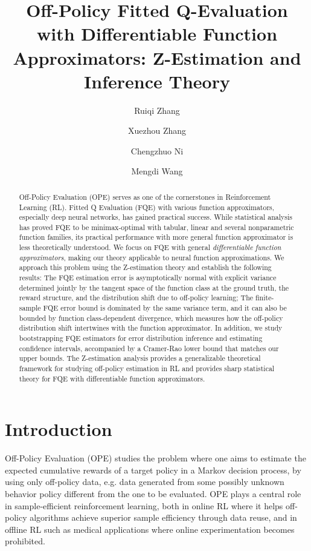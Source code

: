 \documentclass{article}
\numberwithin{equation}{section}
\theoremstyle{plain}
\theoremstyle{definition}
\theoremstyle{remark}
\begin{document}
\title{Off-Policy Fitted Q-Evaluation with Differentiable Function Approximators: Z-Estimation and Inference Theory}
\author[1]{Ruiqi Zhang}
\author[2]{Xuezhou Zhang}
\author[2]{Chengzhuo Ni}
\author[2]{Mengdi Wang}
\date{}
\maketitle

\begin{abstract}
Off-Policy Evaluation (OPE) serves as one of the cornerstones in Reinforcement Learning (RL). Fitted Q Evaluation (FQE) with various function approximators, especially deep neural networks, has gained practical success. While statistical analysis has proved FQE to be minimax-optimal with tabular, linear and several nonparametric function families, its practical performance with more general function approximator is less theoretically understood. We focus on FQE with general \textit{differentiable function approximators}, making our theory applicable to neural function approximations. We approach this problem using the Z-estimation theory and establish the following results: The FQE estimation error is asymptotically normal with explicit variance determined jointly by the tangent space of the function class at the ground truth, the reward structure, and the distribution shift due to off-policy learning; The finite-sample FQE error bound is dominated by the same variance term, and it can also be bounded by function class-dependent divergence, which measures how the off-policy distribution shift intertwines with the function approximator. In addition, we study bootstrapping FQE estimators for error distribution inference and estimating confidence intervals, accompanied by a Cramer-Rao lower bound that matches our upper bounds. The Z-estimation analysis provides a generalizable theoretical framework for studying off-policy estimation in RL and provides sharp statistical theory for FQE with differentiable function approximators.
\end{abstract}

\section{Introduction}
Off-Policy Evaluation (OPE) studies the problem where one aims to estimate the expected cumulative rewards of a target policy in a Markov decision process, by using only off-policy data, e.g. data generated from some possibly unknown behavior policy different from the one to be evaluated. OPE plays a central role in sample-efficient reinforcement learning, both in online RL where it helps off-policy algorithms achieve superior sample efficiency through data reuse, and in offline RL such as medical applications where online experimentation becomes prohibited. 
\end{document}
